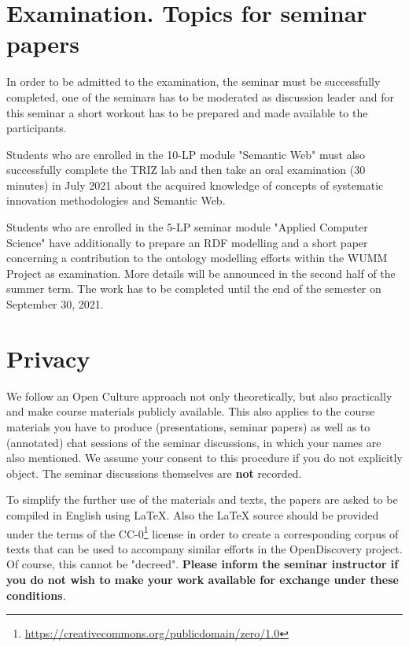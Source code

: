 \documentclass[11pt,a4paper]{article}
\begin{document}
\section{Examination. Topics for seminar papers}

In order to be admitted to the examination, the seminar must be successfully
completed, one of the seminars has to be moderated as discussion leader and
for this seminar a short workout has to be prepared and made available to the
participants.

Students who are enrolled in the 10-LP module "Semantic Web" must also
successfully complete the TRIZ lab and then take an oral examination (30
minutes) in July 2021 about the acquired knowledge of concepts of systematic
innovation methodologies and Semantic Web.

Students who are enrolled in the 5-LP seminar module "Applied Computer
Science" have additionally to prepare an RDF modelling and a short paper
concerning a contribution to the ontology modelling efforts \cite{WOP} within
the WUMM Project as examination.  More details will be announced in the second
half of the summer term. The work has to be completed until the end of the
semester on September 30, 2021.

\section{Privacy}

We follow an Open Culture approach not only theoretically, but also
practically and make course materials publicly available.  This also applies
to the course materials you have to produce (presentations, seminar papers) as
well as to (annotated) chat sessions of the seminar discussions, in which your
names are also mentioned.  We assume your consent to this procedure if you do
not explicitly object.  The seminar discussions themselves are \textbf{not}
recorded.

To simplify the further use of the materials and texts, the papers are asked
to be compiled in English using {\LaTeX}.  Also the {\LaTeX} source should be
provided under the terms of the
CC-0\footnote{\url{https://creativecommons.org/publicdomain/zero/1.0}} license
in order to create a corresponding corpus of texts that can be used to
accompany similar efforts in the OpenDiscovery project. Of course, this cannot
be "decreed". \textbf{Please inform the seminar instructor if you do not wish
  to make your work available for exchange under these conditions}.
\end{document}
